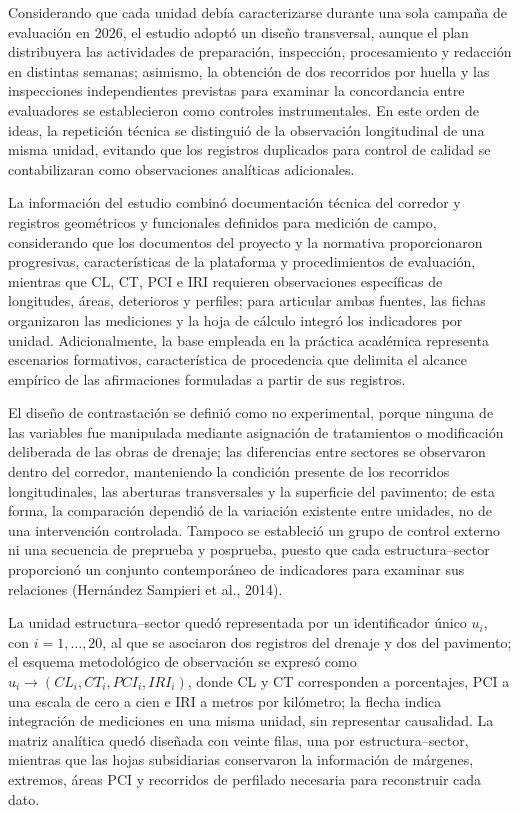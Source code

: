 Considerando que cada unidad debía caracterizarse durante una sola campaña de evaluación en 2026, el estudio adoptó un diseño transversal, aunque el plan distribuyera las actividades de preparación, inspección, procesamiento y redacción en distintas semanas; asimismo, la obtención de dos recorridos por huella y las inspecciones independientes previstas para examinar la concordancia entre evaluadores se establecieron como controles instrumentales. En este orden de ideas, la repetición técnica se distinguió de la observación longitudinal de una misma unidad, evitando que los registros duplicados para control de calidad se contabilizaran como observaciones analíticas adicionales.

La información del estudio combinó documentación técnica del corredor y registros geométricos y funcionales definidos para medición de campo, considerando que los documentos del proyecto y la normativa proporcionaron progresivas, características de la plataforma y procedimientos de evaluación, mientras que CL, CT, PCI e IRI requieren observaciones específicas de longitudes, áreas, deterioros y perfiles; para articular ambas fuentes, las fichas organizaron las mediciones y la hoja de cálculo integró los indicadores por unidad. Adicionalmente, la base empleada en la práctica académica representa escenarios formativos, característica de procedencia que delimita el alcance empírico de las afirmaciones formuladas a partir de sus registros.


El diseño de contrastación se definió como no experimental, porque ninguna de las variables fue manipulada mediante asignación de tratamientos o modificación deliberada de las obras de drenaje; las diferencias entre sectores se observaron dentro del corredor, manteniendo la condición presente de los recorridos longitudinales, las aberturas transversales y la superficie del pavimento; de esta forma, la comparación dependió de la variación existente entre unidades, no de una intervención controlada. Tampoco se estableció un grupo de control externo ni una secuencia de preprueba y posprueba, puesto que cada estructura–sector proporcionó un conjunto contemporáneo de indicadores para examinar sus relaciones (Hernández Sampieri et al., 2014).

La unidad estructura–sector quedó representada por un identificador único \(u_i\), con \(i=1,\ldots,20\), al que se asociaron dos registros del drenaje y dos del pavimento; el esquema metodológico de observación se expresó como \(u_i\longrightarrow(CL_i,CT_i,PCI_i,IRI_i)\), donde CL y CT corresponden a porcentajes, PCI a una escala de cero a cien e IRI a metros por kilómetro; la flecha indica integración de mediciones en una misma unidad, sin representar causalidad. La matriz analítica quedó diseñada con veinte filas, una por estructura–sector, mientras que las hojas subsidiarias conservaron la información de márgenes, extremos, áreas PCI y recorridos de perfilado necesaria para reconstruir cada dato.

